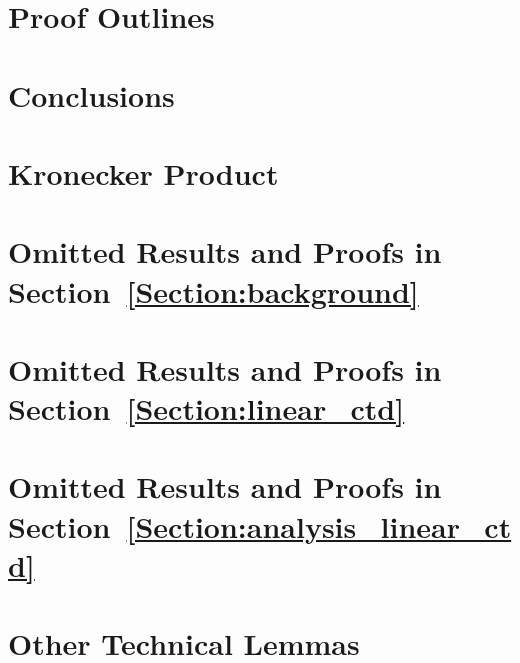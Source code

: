\documentclass[11pt]{article}
\begin{document}
\section{Proof Outlines}\label{Section:proof_outline}

\section{Conclusions}\label{Section:conclusion}





\newpage

\appendix
% 
\section{Kronecker Product}\label{Appendix_kronecker}

\section{Omitted Results and Proofs in Section~\ref{Section:background}}

\section{Omitted Results and Proofs in Section~\ref{Section:linear_ctd}}

\section{Omitted Results and Proofs in Section~\ref{Section:analysis_linear_ctd}}

\section{Other Technical Lemmas}\label{Appendix_technical_lemmas}

\end{document}
